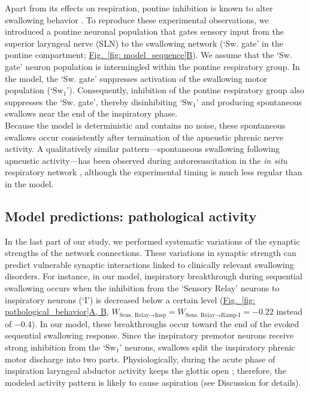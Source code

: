 \documentclass[pdflatex,sn-mathphys-ay]{sn-jnl}%
\renewcommand{\figureautorefname}{Fig.}
\newcommand{\Figref}[2][]{\hyperref[#2]{\figureautorefname~\ref*{#2}#1}}
\theoremstyle{thmstyleone}%
\theoremstyle{thmstyletwo}%
\theoremstyle{thmstylethree}%
\begin{document}
Apart from its effects on respiration, pontine inhibition is known to alter swallowing behavior \citep{takemura2022effect}. To reproduce these experimental observations, we introduced a pontine neuronal population that gates sensory input from the superior laryngeal nerve (SLN) to the swallowing network (`Sw. gate' in the pontine compartment; \Figref[B]{fig: model_sequence}). We assume that the `Sw. gate' neuron population is intermingled within the pontine respiratory group. In the model, the `Sw. gate' suppresses activation of the swallowing motor population (`$\text{Sw}_1$').
Consequently, inhibition of the pontine respiratory group also suppresses the `Sw. gate', thereby disinhibiting `$\text{Sw}_1$' and producing spontaneous swallows near the end of the inspiratory phase. \\
Because the model is deterministic and contains no noise, these spontaneous swallows occur consistently after termination of the apneustic phrenic nerve activity. A qualitatively similar pattern---spontaneous swallowing following apneustic activity---has been observed during autoresuscitation in the \textit{in situ} respiratory network \citep{bautista2014spontaneous}, although the experimental timing is much less regular than in the model.

\subsection{Model predictions: pathological activity}
In the last part of our study, we performed systematic variations of the synaptic strengths of the network connections. These variations in synaptic strength can predict vulnerable synaptic interactions linked to clinically relevant swallowing disorders. For instance, in our model, inspiratory breakthrough during sequential swallowing occurs when the inhibition from the `Sensory Relay' neurons to inspiratory neurons (`I') is decreased below a certain level (\Figref[A, B]{fig: pathological_behavior}, $W_{\text{Sens. Relay} \to \text{Insp}} = W_{\text{Sens. Relay} \to \text{Ramp-I}} = -0.22$ instead of $-0.4$). In our model, these breakthroughs occur toward the end of the evoked sequential swallowing response. Since the inspiratory premotor neurons receive strong inhibition from the `$\text{Sw}_1$' neurons, swallows split the inspiratory phrenic motor discharge into two parts. Physiologically, during the acute phase of inspiration laryngeal abductor activity keeps the glottis open \citep{dutschmann2002glycinergic, dutschmann2002inhibitory}; therefore, the modeled activity pattern is likely to cause aspiration (see Discussion for details). 
\end{document}
